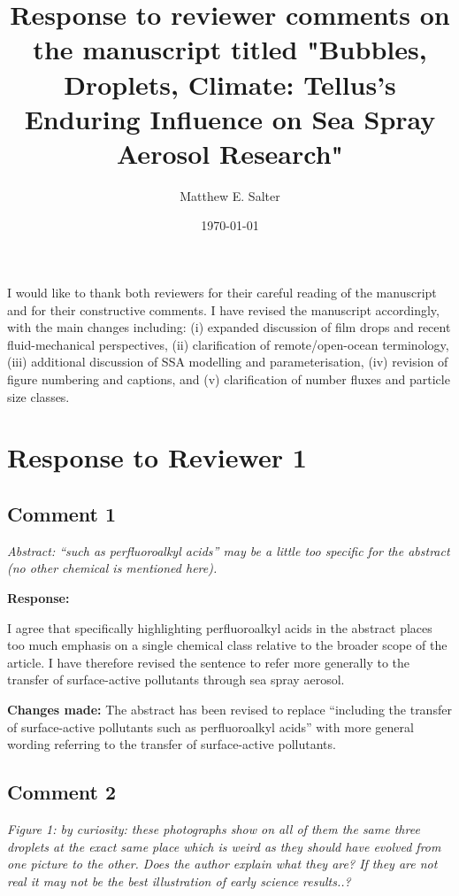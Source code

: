 \documentclass[11pt]{article}
\begin{document}
\title{Response to reviewer comments on the manuscript titled "Bubbles, Droplets, Climate: Tellus's Enduring Influence on Sea Spray Aerosol Research"}
\author{Matthew E. Salter}
\date{\today}

\maketitle

I would like to thank both reviewers for their careful reading of the manuscript and for their constructive comments. I have revised the manuscript accordingly, with the main changes including: (i) expanded discussion of film drops and recent fluid-mechanical perspectives, (ii) clarification of remote/open-ocean terminology, (iii) additional discussion of SSA modelling and parameterisation, (iv) revision of figure numbering and captions, and (v) clarification of number fluxes and particle size classes.

\section*{Response to Reviewer 1}

\subsection*{Comment 1}

\emph{Abstract: ``such as perfluoroalkyl acids'' may be a little too specific for the abstract (no other chemical is mentioned here).}

\textbf{Response:}

I agree that specifically highlighting perfluoroalkyl acids in the abstract places too much emphasis on a single chemical class relative to the broader scope of the article. I have therefore revised the sentence to refer more generally to the transfer of surface-active pollutants through sea spray aerosol.

\textbf{Changes made:}
The abstract has been revised to replace ``including the transfer of surface-active pollutants such as perfluoroalkyl acids'' with more general wording referring to the transfer of surface-active pollutants.

\subsection*{Comment 2}

\emph{Figure 1: by curiosity: these photographs show on all of them the same three droplets at the exact same place which is weird as they should have evolved from one picture to the other. Does the author explain what they are? If they are not real it may not be the best illustration of early science results..?}
\end{document}
